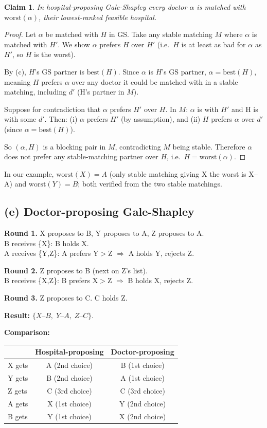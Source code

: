 \documentclass[11pt]{article}
\newtheorem*{claim}{Claim}
\begin{document}
\begin{claim}
In hospital-proposing Gale-Shapley every doctor $\alpha$ is matched with $\mathrm{worst}(\alpha)$, their lowest-ranked feasible hospital.
\end{claim}
\begin{proof}
Let $\alpha$ be matched with $H$ in GS.  Take any stable matching $M$ where $\alpha$ is matched with $H'$.  We show $\alpha$ prefers $H$ over $H'$ (i.e.\ $H$ is at least as bad for $\alpha$ as $H'$, so $H$ is the worst).

By (c), $H$'s GS partner is $\mathrm{best}(H)$.  Since $\alpha$ is $H$'s GS partner, $\alpha = \mathrm{best}(H)$, meaning $H$ prefers $\alpha$ over any doctor it could be matched with in a stable matching, including $d'$ (H's partner in $M$).

Suppose for contradiction that $\alpha$ prefers $H'$ over $H$.  In $M$: $\alpha$ is with $H'$ and H is with some $d'$.  Then:
(i) $\alpha$ prefers $H'$ (by assumption), and
(ii) $H$ prefers $\alpha$ over $d'$ (since $\alpha = \mathrm{best}(H)$).

So $(\alpha, H)$ is a blocking pair in $M$, contradicting $M$ being stable.  Therefore $\alpha$ does not prefer any stable-matching partner over $H$, i.e.\ $H = \mathrm{worst}(\alpha)$.
\end{proof}

In our example, $\mathrm{worst}(X) = A$ (only stable matching giving X the worst is X--A) and $\mathrm{worst}(Y) = B$; both verified from the two stable matchings.

\subsection*{(e) Doctor-proposing Gale-Shapley}

\textbf{Round 1.}
X proposes to B, Y proposes to A, Z proposes to A.\\
B receives \{X\}: B holds X.\\
A receives \{Y,Z\}: A prefers Y$>$Z $\Rightarrow$ A holds Y, rejects Z.

\textbf{Round 2.}
Z proposes to B (next on Z's list).\\
B receives \{X,Z\}: B prefers X$>$Z $\Rightarrow$ B holds X, rejects Z.

\textbf{Round 3.}
Z proposes to C.  C holds Z.

\textbf{Result:} $\{X\text{--}B,\; Y\text{--}A,\; Z\text{--}C\}$.

\textbf{Comparison:}
\begin{center}
\begin{tabular}{lcc}
\toprule
 & Hospital-proposing & Doctor-proposing \\
\midrule
X gets & A (2nd choice) & B (1st choice) \\
Y gets & B (2nd choice) & A (1st choice) \\
Z gets & C (3rd choice) & C (3rd choice) \\
A gets & X (1st choice) & Y (2nd choice) \\
B gets & Y (1st choice) & X (2nd choice) \\
\bottomrule
\end{tabular}
\end{center}
\end{document}
